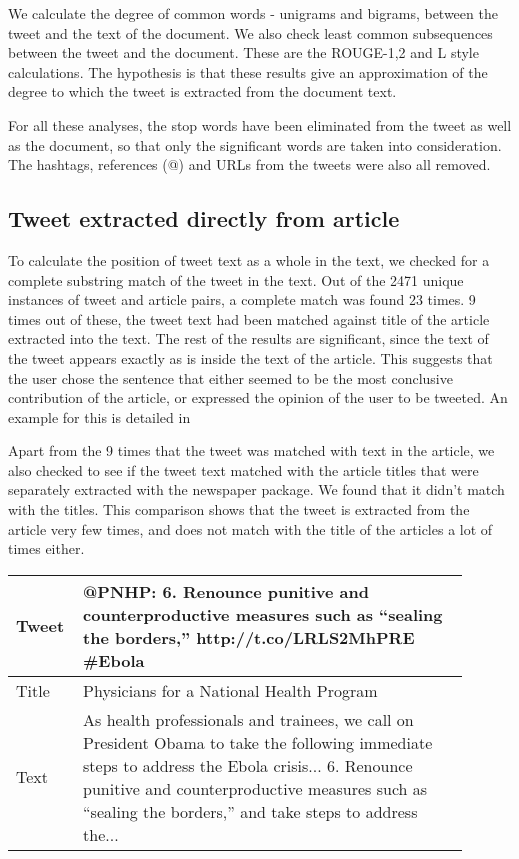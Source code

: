 We calculate the degree of common words - unigrams and bigrams, between the tweet and the text of the document. We also check least common subsequences between the tweet and the document. These are the ROUGE-1,2 and L style calculations. The hypothesis is that these results give an approximation of the degree to which the tweet is extracted from the document text. 

For all these analyses, the stop words have been eliminated from the tweet as well as the document, so that only the significant words are taken into consideration. The hashtags, references (@) and URLs from the tweets were also all removed.

\subsection {Tweet extracted directly from article}
To calculate the position of tweet text as a whole in the text, we checked for a complete substring match of the tweet in the text. Out of the 2471 unique instances of tweet and article pairs, a complete match was found 23 times. 9 times out of these, the tweet text had been matched against title of the article extracted into the text. The rest of the results are significant, since the text of the tweet appears exactly as is inside the text of the article. This suggests that the user chose the sentence that either seemed to be the most conclusive contribution of the article, or expressed the opinion of the user to be tweeted. An example for this is detailed in 

Apart from the 9 times that the tweet was matched with text in the article, we also checked to see if the tweet text matched with the article titles that were separately extracted with the newspaper package. We found that it didn't match with the titles. This comparison shows that the tweet is extracted from the article very few times, and does not match with the title of the articles a lot of times either.  

\begin{table}[htbp]
\centering
\begin{tabular}{|p{0.1\linewidth}|p{0.8\linewidth}|}
\hline
Tweet &  @PNHP: 6. Renounce punitive and counterproductive measures such as “sealing the borders,” http://t.co/LRLS2MhPRE \#Ebola \\ \hline
Title & Physicians for a National Health Program \\  \hline
Text  & As health professionals and trainees, we call on President Obama to take the following immediate steps to address the Ebola crisis... 6. Renounce punitive and counterproductive measures such as “sealing the borders,” and take steps to address the... \\ \hline
\end{tabular}
\label{tab:fullextract}
\end{table}

